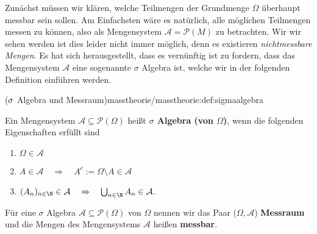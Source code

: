 \documentclass[letterpaper,10pt,english]{jupyterBook}
\begin{document}
\par
Zunächst müssen wir klären, welche Teilmengen der Grundmenge \(\Omega\) überhaupt messbar sein sollen.
Am Einfachsten wäre es natürlich, alle möglichen Teilmengen messen zu können, also als Mengensystem \(\mathcal{A} = \mathcal{P}(M)\) zu betrachten.
Wir wir sehen werden ist dies leider nicht immer möglich, denn es existieren \emph{nichtmessbare Mengen}.
Es hat sich herausgestellt, dass es vernünftig ist zu fordern, dass das Mengensystem \(\mathcal{A}\) eine sogenannte \(\sigma\) Algebra ist, welche wir in der folgenden Definition einführen werden.
\begin{definition}{(\protect\(\sigma\protect\) Algebra und Messraum)}{masstheorie/masstheorie:def:sigmaalgebra}



\par
Ein Mengensystem \(\mathcal{A} \subseteq \mathcal{P}(\Omega)\) heißt \textbf{\(\sigma\) Algebra (von \(\Omega\))}, wenn die folgenden Eigenschaften erfüllt sind
\begin{enumerate}

\item {} 
\par
\(\Omega\in \mathcal{A}\)

\item {} 
\par
\(A\in \mathcal{A} \quad \Rightarrow \quad A^c:=\Omega \setminus A\in \mathcal{A}\)

\item {} 
\par
\((A_n)_{n\in\N} \in \mathcal{A} \quad \Rightarrow \quad \bigcup_{n\in \N} A_n\in \mathcal{A}\).

\end{enumerate}

\par
Für eine \(\sigma\) Algebra \(\mathcal{A} \subseteq \mathcal{P}(\Omega)\) von \(\Omega\) nennen wir das Paar (\(\Omega,\mathcal{A}\)) \textbf{Messraum} und die Mengen des Mengensystems \(\mathcal{A}\) heißen \textbf{messbar}.
\end{definition}
\end{document}
